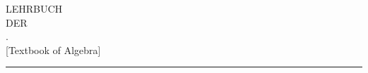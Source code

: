 \begin{center}
\vspace*{6cm}
{\Large LEHRBUCH}\\[1.2cm]
{\small DER}\\[1cm]
{\Huge {}.}\\[0.6cm]
{\large [Textbook of Algebra]}\\[1.2cm]
\rule{3.5cm}{0.4pt}
\end{center}
